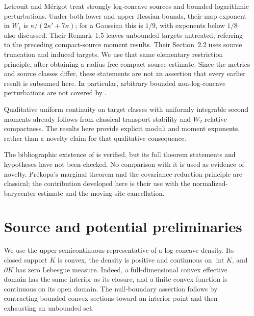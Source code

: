 \documentclass[11pt]{article}
\numberwithin{equation}{section}
\theoremstyle{remark}
\newcommand{\interior}{\operatorname{int}}
\begin{document}
Letrouit and M\'erigot \cite[Theorem 1.4]{LetrouitMerigot2026} treat strongly log-concave sources and bounded logarithmic perturbations. Under both lower and upper Hessian bounds, their map exponent in $W_1$ is $\kappa/(2\kappa'+7\kappa)$; for a Gaussian this is $1/9$, with exponents below $1/8$ also discussed. Their Remark~1.5 leaves unbounded targets untreated, referring to the preceding compact-source moment results. Their Section~2.2 uses source truncation and induced targets. We use that same elementary restriction principle, after obtaining a radius-free compact-source estimate. Since the metrics and source classes differ, these statements are not an assertion that every earlier result is subsumed here. In particular, arbitrary bounded non-log-concave perturbations are not covered by .

Qualitative uniform continuity on target classes with uniformly integrable second moments already follows from classical transport stability and $W_2$ relative compactness. The results here provide explicit moduli and moment exponents, rather than a novelty claim for that qualitative consequence.

The bibliographic existence of \cite{Merigot2026} is verified, but its full theorem statements and hypotheses have not been checked. No comparison with it is used as evidence of novelty. Pr\'ekopa's marginal theorem \cite{Prekopa1973} and the covariance reduction principle \cite{KanterProppe1977} are classical; the contribution developed here is their use with the normalized-barycenter estimate and the moving-site cancellation.

\section{Source and potential preliminaries}\label{sec:prelim}
We use the upper-semicontinuous representative of a log-concave density. Its closed support $K$ is convex, the density is positive and continuous on $\interior K$, and $\partial K$ has zero Lebesgue measure. Indeed, a full-dimensional convex effective domain has the same interior as its closure, and a finite convex function is continuous on its open domain. The null-boundary assertion follows by contracting bounded convex sections toward an interior point and then exhausting an unbounded set.
\end{document}
